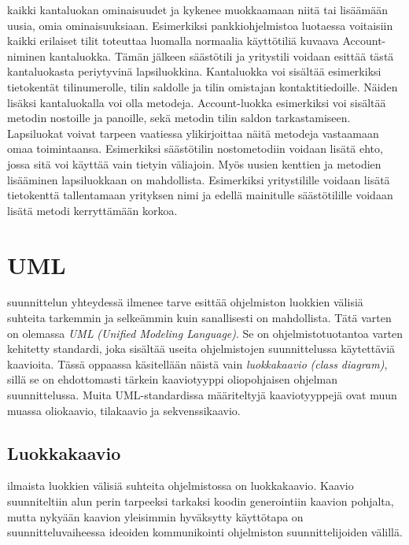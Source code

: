 \documentclass{tufte-book}
\newcommand{\eng}[1]{\textit{(#1)}}
\newcommand{\new}[1]{\textit{\gls{#1}}}
\newcommand{\neweng}[2]{\new{#1} \eng{#2}}
\begin{document}
 kaikki kantaluokan ominaisuudet ja kykenee muokkaamaan niitä tai
lisäämään uusia, omia ominaisuuksiaan. Esimerkiksi pankkiohjelmistoa luotaessa voitaisiin kaikki
erilaiset tilit toteuttaa luomalla normaalia käyttötiliä kuvaava Account-niminen kantaluokka.
Tämän jälkeen säästötili ja yritystili voidaan esittää tästä kantaluokasta periytyvinä
lapsiluokkina. Kantaluokka voi sisältää esimerkiksi tietokentät tilinumerolle, tilin saldolle ja
tilin omistajan kontaktitiedoille. Näiden lisäksi kantaluokalla voi olla metodeja. Account-luokka
esimerkiksi voi sisältää metodin nostoille ja panoille, sekä metodin tilin saldon tarkastamiseen.
Lapsiluokat voivat tarpeen vaatiessa ylikirjoittaa näitä metodeja vastaamaan omaa toimintaansa.
Esimerkiksi säästötilin nostometodiin voidaan lisätä ehto, jossa sitä voi käyttää vain tietyin
väliajoin. Myös uusien kenttien ja metodien lisääminen lapsiluokkaan on mahdollista. Esimerkiksi
yritystilille voidaan lisätä tietokenttä tallentamaan yrityksen nimi ja edellä mainitulle
säästötilille voidaan lisätä metodi kerryttämään korkoa.


\section{UML}
\label{paskaa}

 suunnittelun yhteydessä ilmenee tarve esittää ohjelmiston
luokkien välisiä suhteita tarkemmin ja selkeämmin kuin sanallisesti on mahdollista. Tätä varten on
olemassa \neweng{UML}{Unified Modeling Language}. Se on ohjelmistotuotantoa varten kehitetty
standardi, joka sisältää useita ohjelmistojen suunnittelussa käytettäviä kaavioita. Tässä oppaassa
käsitellään näistä vain \neweng{luokkakaavio}{class diagram}, sillä se on ehdottomasti tärkein
kaaviotyyppi oliopohjaisen ohjelman suunnittelussa. Muita UML-standardissa määriteltyjä
kaaviotyyppejä ovat muun muassa oliokaavio, tilakaavio ja sekvenssikaavio.

\subsection{Luokkakaavio}
\label{luokkakaavio}

 ilmaista luokkien välisiä suhteita ohjelmistossa on
\gls{luokkakaavio}. Kaavio suunniteltiin alun perin tarpeeksi tarkaksi koodin generointiin kaavion
pohjalta, mutta nykyään kaavion yleisimmin hyväksytty käyttötapa on suunnitteluvaiheessa ideoiden
kommunikointi ohjelmiston suunnittelijoiden välillä.
\end{document}
